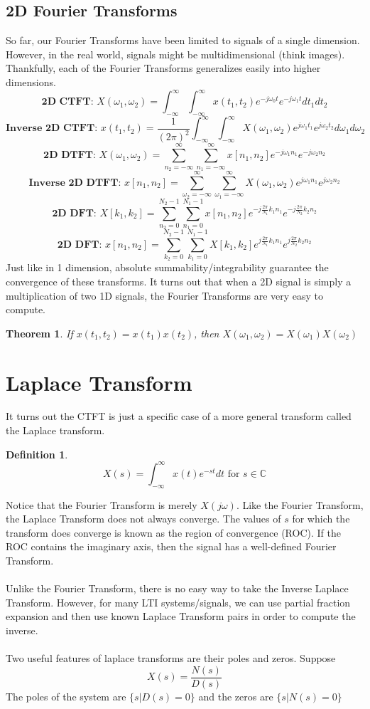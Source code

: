 \documentclass{article}
\newtheorem{theorem}{Theorem}
\newtheorem{definition}{Definition}
\begin{document}
\subsection{2D Fourier Transforms}
So far, our Fourier Transforms have been limited to signals of a single dimension. However, in the real world, signals might be multidimensional (think images).
Thankfully, each of the Fourier Transforms generalizes easily into higher dimensions.\\
$$\textbf{2D CTFT: }X(\omega_1, \omega_2) = \int_{-\infty}^{\infty}\int_{-\infty}^{\infty}{x(t_1, t_2)e^{-j\omega_0t}e^{-j\omega_1t}dt_1dt_2}$$
$$\textbf{Inverse 2D CTFT: }x(t_1, t_2) = \frac{1}{(2\pi)^2}\int_{-\infty}^{\infty}\int_{-\infty}^{\infty}{X(\omega_1, \omega_2)e^{j\omega_1t_1}e^{j\omega_2t_2}d\omega_1d\omega_2}$$
$$\textbf{2D DTFT: }X(\omega_1, \omega_2) = \sum_{n_2=-\infty}^{\infty}\sum_{n_1=-\infty}^{\infty}{x[n_1,n_2]e^{-j\omega_1n_1}e^{-j\omega_2n_2}}$$
$$\textbf{Inverse 2D DTFT: }x[n_1, n_2] = \sum_{\omega_2=-\infty}^{\infty}\sum_{\omega_1=-\infty}^{\infty}{X(\omega_1,\omega_2)e^{j\omega_1n_1}e^{j\omega_2n_2}}$$
$$\textbf{2D DFT: }X[k_1, k_2] = \sum_{n_2=0}^{N_2-1}\sum_{n_1=0}^{N_1-1}{x[n_1, n_2]e^{-j\frac{2\pi}{N_1}k_1 n_1}e^{-j\frac{2\pi}{N_2}k_2 n_2}}$$
$$\textbf{2D DFT: }x[n_1, n_2] = \sum_{k_2=0}^{N_2-1}\sum_{k_1=0}^{N_1-1}{X[k_1, k_2]e^{j\frac{2\pi}{N_1}k_1 n_1}e^{j\frac{2\pi}{N_2}k_2 n_2}}$$
Just like in 1 dimension, absolute summability/integrability guarantee the convergence of these transforms.
It turns out that when a 2D signal is simply a multiplication of two 1D signals, the Fourier Transforms are very easy to compute.
\begin{theorem}
    If $x(t_1, t_2) = x(t_1)x(t_2)$, then $X(\omega_1, \omega_2) = X(\omega_1)X(\omega_2)$
\end{theorem}
\section{Laplace Transform}
It turns out the CTFT  is just a specific case of a more general transform called the Laplace transform.
\begin{definition}
    $$X(s) = \int_{-\infty}^{\infty}{x(t)e^{-st}dt} \text { for } s\in\mathbb{C}$$
\end{definition}
Notice that the Fourier Transform is merely $X(j\omega)$. Like the Fourier Transform, the Laplace Transform does not always converge.
The values of $s$ for which the transform does converge is known as the region of convergence (ROC). If the ROC contains the imaginary axis,
then the signal has a well-defined Fourier Transform. \\\\
Unlike the Fourier Transform, there is no easy way to take the Inverse Laplace Transform.
However, for many LTI systems/signals, we can use partial fraction expansion and then use known Laplace Transform pairs in order to compute the inverse.\\\\
Two useful features of laplace transforms are their poles and zeros. Suppose
$$X(s) = \frac{N(s)}{D(s)}$$
The poles of the system are $\{s | D(s)=0\}$ and the zeros are $\{s | N(s)=0\}$
\end{document}
